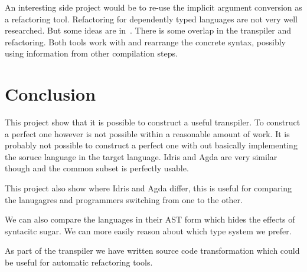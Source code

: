 An interesting side project would be to re-use the implicit argument conversion
as a refactoring tool. Refactoring for dependently typed languages are not very
well researched. But some ideas are in~\cite{wiberg2019}. There is some
overlap in the transpiler and refactoring. Both tools work with and rearrange
the concrete syntax, possibly using information from other compilation steps.


\section{Conclusion}

This project show that it is possible to construct
a useful transpiler. To construct a perfect one however is not possible within
a reasonable amount of work. It is probably not possible to construct a perfect
one with out basically implementing the soruce language in the target language.
Idris and Agda are very similar though and the common subset is perfectly
usable.

This project also show where Idris and Agda differ, this is useful for
comparing the lanugagres and programmers switching from one to the other.

We can also compare the languages in their AST form which hides the effects of
syntacitc sugar. We can more easily reason about which type system we prefer.

As part of the transpiler we have written source code transformation which
could be useful for automatic refactoring tools.



